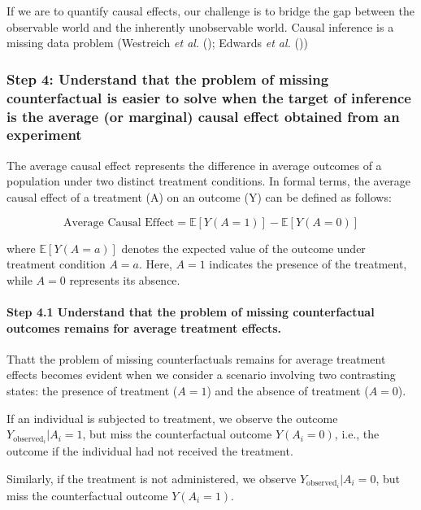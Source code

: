 \documentclass[
  singlecolumn]{article}
\let\oldparagraph\paragraph
\renewcommand{\paragraph}[1]{\oldparagraph{#1}\mbox{}}
\begin{document}
If we are to quantify causal effects, our challenge is to bridge the gap
between the observable world and the inherently unobservable world.
Causal inference is a missing data problem (Westreich \emph{et al.}
(); Edwards \emph{et al.}
())

\subsubsection{Step 4: Understand that the problem of missing
counterfactual is easier to solve when the target of inference is the
average (or marginal) causal effect obtained from an
experiment}\label{step-4-understand-that-the-problem-of-missing-counterfactual-is-easier-to-solve-when-the-target-of-inference-is-the-average-or-marginal-causal-effect-obtained-from-an-experiment}

The average causal effect represents the difference in average outcomes
of a population under two distinct treatment conditions. In formal
terms, the average causal effect of a treatment (A) on an outcome (Y)
can be defined as follows:

\[
\text{Average Causal Effect} = \mathbb{E}[Y(A = 1)] - \mathbb{E}[Y(A = 0)]
\]

where \(\mathbb{E}[Y(A = a)]\) denotes the expected value of the outcome
under treatment condition \(A = a\). Here, \(A = 1\) indicates the
presence of the treatment, while \(A = 0\) represents its absence.

\paragraph{Step 4.1 Understand that the problem of missing
counterfactual outcomes remains for average treatment
effects.}\label{step-4.1-understand-that-the-problem-of-missing-counterfactual-outcomes-remains-for-average-treatment-effects.}

Thatt the problem of missing counterfactuals remains for average
treatment effects becomes evident when we consider a scenario involving
two contrasting states: the presence of treatment (\(A = 1\)) and the
absence of treatment (\(A = 0\)).

If an individual is subjected to treatment, we observe the outcome
\(Y_{\text{observed}_i}|A_i = 1\), but miss the counterfactual outcome
\(Y(A_i = 0)\), i.e., the outcome if the individual had not received the
treatment.

Similarly, if the treatment is not administered, we observe
\(Y_{\text{observed}_i}|A_i = 0\), but miss the counterfactual outcome
\(Y(A_i = 1)\).
\end{document}
